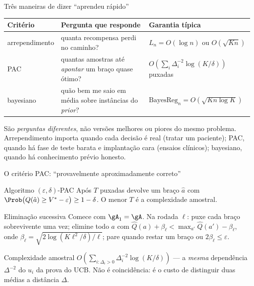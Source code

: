 \documentclass[aspectratio=169, 11pt]{beamer}
\newcommand{\Qh}{\widehat{Q}}
\begin{document}
\begin{frame}{Três maneiras de dizer ``aprendeu rápido''}
  \begin{center}\footnotesize
  \begin{tabular}{@{}p{2.4cm}p{4.1cm}p{4.6cm}@{}}
    \toprule
    \textbf{Critério} & \textbf{Pergunta que responde} & \textbf{Garantia típica} \\
    \midrule
    arrependimento & quanta recompensa perdi no caminho? & $L_n = O(\log n)$ ou $O(\sqrt{Kn})$ \\[0.3em]
    PAC & quantas amostras até \emph{apontar} um braço quase ótimo? &
      $O\!\left(\sum_i \Delta_i^{-2}\log(K/\delta)\right)$ puxadas \\[0.3em]
    bayesiano & quão bem me saio em média sobre instâncias do \emph{prior}? &
      $\mathrm{BayesReg}_n = O(\sqrt{Kn\log K})$ \\
    \bottomrule
  \end{tabular}
  \end{center}

  \begin{ideiabox}
    São \emph{perguntas diferentes}, não versões melhores ou piores do mesmo
    problema. Arrependimento importa quando cada decisão é real (tratar um
    paciente); PAC, quando há fase de teste barata e implantação cara (ensaios
    clínicos); bayesiano, quando há conhecimento prévio honesto.
  \end{ideiabox}
\end{frame}

\begin{frame}{O critério PAC: ``provavelmente aproximadamente correto''}
  \begin{defbox}{Algoritmo $(\varepsilon,\delta)$-PAC}
    Após $T$ puxadas devolve um braço $\hat{a}$ com
    $\Prob\bigl(Q(\hat{a}) \ge V^{*}-\varepsilon\bigr) \ge 1-\delta$. O menor
    $T$ é a \alert{complexidade amostral}.
  \end{defbox}

  \begin{algbox}{Eliminação sucessiva}
    {\small Comece com $\gA_1=\gA$. Na rodada $\ell$: puxe cada braço
    sobrevivente uma vez; elimine todo $a$ com
    $\Qh(a)+\beta_\ell < \max_{a'}\Qh(a')-\beta_\ell$, onde
    $\beta_\ell = \sqrt{2\log(K\ell^{2}/\delta)/\ell}$; pare quando restar um
    braço ou $2\beta_\ell \le \varepsilon$.}
  \end{algbox}

  {\small Complexidade amostral $O\!\left(\sum_{i:\Delta_i>0}\Delta_i^{-2}
  \log(K/\delta)\right)$ --- a \emph{mesma} dependência $\Delta^{-2}$ do $u_i$
  da prova do UCB. Não é coincidência: é o custo de distinguir duas médias a
  distância $\Delta$.}
\end{frame}
\end{document}

